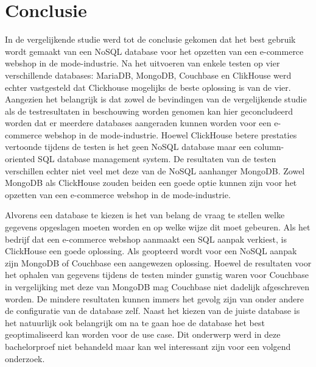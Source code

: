 
\chapter{Conclusie}%
\label{ch:conclusie}


In de vergelijkende studie werd tot de conclusie gekomen dat het best gebruik wordt gemaakt van een NoSQL database voor het opzetten van een e-commerce webshop in de mode-industrie. Na het uitvoeren van enkele testen op vier verschillende databases: MariaDB, MongoDB, Couchbase en ClikHouse werd echter vastgesteld dat Clickhouse mogelijks de beste oplossing is van de vier. Aangezien het belangrijk is dat zowel de bevindingen van de vergelijkende studie als de testresultaten in beschouwing worden genomen kan hier geconcludeerd worden dat er meerdere databases aangeraden kunnen worden voor een e-commerce webshop in de mode-industrie. Hoewel ClickHouse betere prestaties vertoonde tijdens de testen is het geen NoSQL database maar een column-oriented SQL database management system. De resultaten van de testen verschillen echter niet veel met deze van de NoSQL aanhanger MongoDB. Zowel MongoDB als ClickHouse zouden beiden een goede optie kunnen zijn voor het opzetten van een e-commerce webshop in de mode-industrie. 

\vspace{5mm}

Alvorens een database te kiezen is het van belang de vraag te stellen welke gegevens opgeslagen moeten worden en op welke wijze dit moet gebeuren. Als het bedrijf dat een e-commerce webshop aanmaakt een SQL aanpak verkiest, is ClickHouse een goede oplossing. Als geopteerd wordt voor een NoSQL aanpak zijn MongoDB of Couchbase een aangewezen oplossing. Hoewel de resultaten voor het ophalen van gegevens tijdens de testen minder gunstig waren voor Couchbase in vergelijking met deze van MongoDB mag Couchbase niet dadelijk afgeschreven worden. De mindere resultaten kunnen immers het gevolg zijn van onder andere de configuratie van de database zelf. Naast het kiezen van de juiste database is het natuurlijk ook belangrijk om na te gaan hoe de database het best geoptimaliseerd kan worden voor de use case. Dit onderwerp werd in deze bachelorproef niet behandeld maar kan wel interessant zijn voor een volgend onderzoek.  